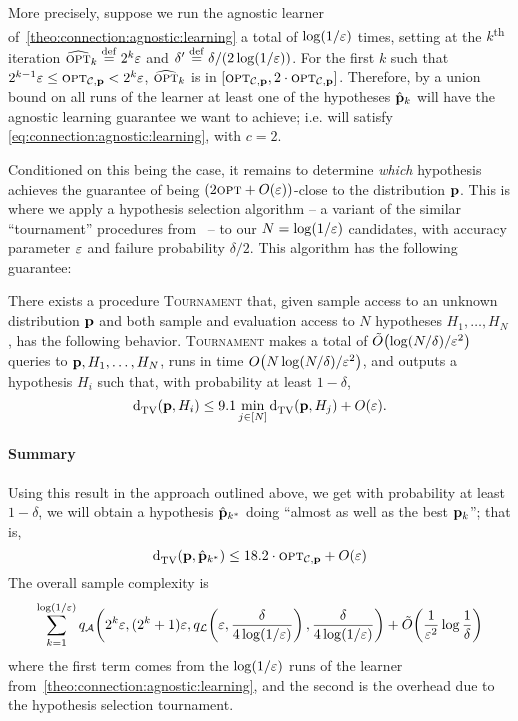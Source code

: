 More precisely, suppose we run the agnostic learner of~\cref{theo:connection:agnostic:learning} a total of $\log(1/\varepsilon)$ times, setting at the $k$\textsuperscript{th} iteration $\widehat{{\textsc{opt}}}_k\stackrel{\rm def}{=} 2^k\varepsilon$ and $\delta^\prime\stackrel{\rm def}{=} \delta/(2\log(1/\varepsilon))$. For the first $k$ such that $2^{k-1}\varepsilon \leq {\textsc{opt}}_{\mathcal{C},\mathbf{p}} < 2^k\varepsilon$, $\widehat{{\textsc{opt}}}_k$ is in $[{\textsc{opt}}_{\mathcal{C},\mathbf{p}}, 2\cdot {\textsc{opt}}_{\mathcal{C},\mathbf{p}}]$. Therefore, by a union bound on all runs of the learner at least one of the hypotheses $\hat{\mathbf{p}}_k$ will have the agnostic learning guarantee we want to achieve; i.e. will satisfy \eqref{eq:connection:agnostic:learning}, with $c=2$.

Conditioned on this being the case, it remains to determine \emph{which} hypothesis achieves the guarantee of being $(2\opt+\bigO{\eps})$-close to the distribution $\mathbf{p}$. This is where 
we apply a hypothesis selection algorithm -- a variant of the similar ``tournament'' procedures from~\cite{DL:01,DK:13,AJOS:14:ISIT} -- to our $N=\log(1/\varepsilon)$ candidates, 
with accuracy parameter $\varepsilon$ and failure probability $\delta/2$. This algorithm has the following guarantee:
\begin{proposition}[\cite{CK:15}]\label{prop:tournament}
  There exists a procedure \textsc{Tournament} that, given sample access to an unknown distribution $\mathbf{p}$ and both sample and evaluation access to $N$ hypotheses $H_1,\dots,H_N$, has the following behavior. \textsc{Tournament} makes a total of $\tildeO{{\log(N/\delta)}/{\eps^2}}$ queries to $\mathbf{p},H_1,\dots,H_N$, runs in time $\bigO{{N\log(N/\delta)}/{\eps^2}}$, and outputs a hypothesis $H_i$ such that, with probability at least $1-\delta$,
  \[
      \totalvardist{\D}{H_i} \leq 9.1 \min_{j\in[N] } \totalvardist{\D}{H_j} + \bigO{\eps}.
  \]
\end{proposition}

\paragraph{Summary} Using this result in the approach outlined above, we get with probability at least $1-\delta$, we will obtain a hypothesis $\hat{\mathbf{p}}_{k^\ast}$ doing ``almost as well as the best $\mathbf{p}_k$''; that is,
\[
	\totalvardist{ \D }{ \hat{\D}_{k^\ast} } \leq 18.2\cdot \opt_{\class,\D} + \bigO{\eps}
\]
The overall sample complexity is
\[
	\sum_{k=1}^{\log(1/\eps)}q_\Algo\!\left(2^k\eps,(2^{k}+1)\eps, q_\Learner\!\left(\eps,\frac{\delta}{4\log(1/\eps)}\right),\frac{\delta}{4\log(1/\eps)}\right) + \tildeO{ \frac{1}{\eps^2}\log\frac{1}{\delta} } 
\]
where the first term comes from the $\log(1/\varepsilon)$ runs of the learner from~\cref{theo:connection:agnostic:learning}, and the second is the overhead due to the hypothesis selection tournament.




